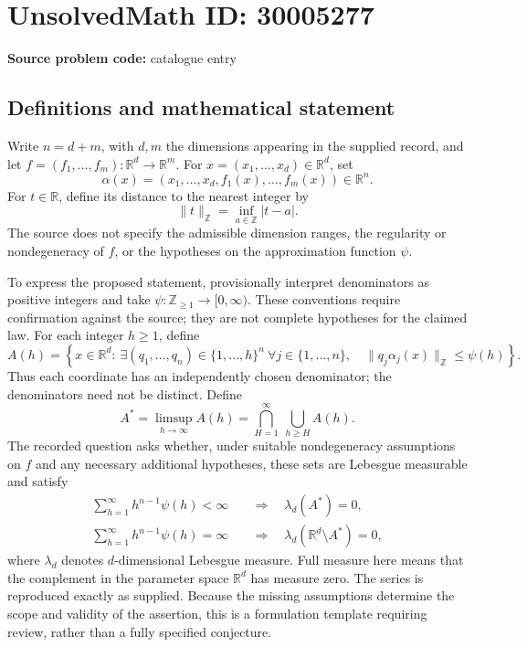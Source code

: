 \documentclass[11pt]{article}
\newcommand{\Z}{\mathbb{Z}}
\newcommand{\R}{\mathbb{R}}
\begin{document}
\section*{UnsolvedMath ID: 30005277}
\textbf{Source problem code:} catalogue entry
\subsection{Definitions and mathematical statement}
Write \(n=d+m\), with \(d,m\) the dimensions appearing in the supplied record, and let \(f=(f_1,\ldots,f_m):\R^d\to\R^m\). For \(x=(x_1,\ldots,x_d)\in\R^d\), set
\[
\alpha(x)=(x_1,\ldots,x_d,f_1(x),\ldots,f_m(x))\in\R^n.
\]
For \(t\in\R\), define its distance to the nearest integer by
\[
\|t\|_{\Z}=\inf_{a\in\Z}|t-a|.
\]
The source does not specify the admissible dimension ranges, the regularity or nondegeneracy of \(f\), or the hypotheses on the approximation function \(\psi\).

To express the proposed statement, provisionally interpret denominators as positive integers and take \(\psi:\Z_{\geq1}\to[0,\infty)\). These conventions require confirmation against the source; they are not complete hypotheses for the claimed law. For each integer \(h\geq1\), define
\[
A(h)=\left\{x\in\R^d:\ \exists(q_1,\ldots,q_n)\in\{1,\ldots,h\}^n\ \forall j\in\{1,\ldots,n\},\quad
\|q_j\alpha_j(x)\|_{\Z}\leq\psi(h)\right\}.
\]
Thus each coordinate has an independently chosen denominator; the denominators need not be distinct. Define
\[
A^*=\limsup_{h\to\infty}A(h)
=\bigcap_{H=1}^{\infty}\ \bigcup_{h\geq H}A(h).
\]
The recorded question asks whether, under suitable nondegeneracy assumptions on \(f\) and any necessary additional hypotheses, these sets are Lebesgue measurable and satisfy
\[
\begin{aligned}
\sum_{h=1}^{\infty}h^{n-1}\psi(h)<\infty
&\quad\Longrightarrow\quad \lambda_d(A^*)=0,\\
\sum_{h=1}^{\infty}h^{n-1}\psi(h)=\infty
&\quad\Longrightarrow\quad \lambda_d(\R^d\setminus A^*)=0,
\end{aligned}
\]
where \(\lambda_d\) denotes \(d\)-dimensional Lebesgue measure. Full measure here means that the complement in the parameter space \(\R^d\) has measure zero. The series is reproduced exactly as supplied. Because the missing assumptions determine the scope and validity of the assertion, this is a formulation template requiring review, rather than a fully specified conjecture.
\end{document}
